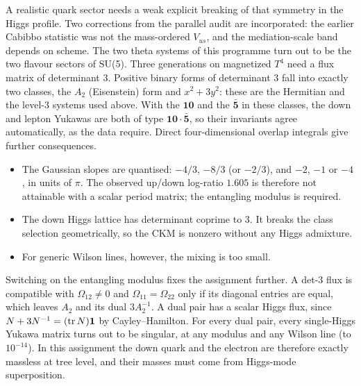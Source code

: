 A realistic quark sector needs a weak explicit breaking of that symmetry in the Higgs profile. Two corrections from
the parallel audit are incorporated: the earlier Cabibbo statistic was not the mass-ordered $V_{us}$, and the
mediation-scale band depends on scheme. 
The two theta systems of this programme turn out to be the two flavour sectors of SU(5). Three generations on
magnetized $T^4$ need a flux matrix of determinant 3. Positive binary forms of determinant 3 fall into exactly two
classes, the $A_2$ (Eisenstein) form and $x^2+3y^2$: these are the Hermitian and the level-3 systems used above. With the
$\mathbf{10}$ and the $\bar{\mathbf5}$ in these classes, the down and lepton Yukawas are both of type
$\mathbf{10}\cdot\bar{\mathbf5}$, so their invariants agree automatically, as the data require. Direct four-dimensional
overlap integrals give further consequences.
\begin{itemize}
\item The Gaussian slopes are quantised: $-4/3$, $-8/3$ (or $-2/3$), and $-2$, $-1$ or $-4$, in units of $\pi$. The
observed up/down log-ratio $1.605$ is therefore not attainable with a scalar period matrix; the entangling modulus is
required.
\item The down Higgs lattice has determinant coprime to 3. It breaks the class selection geometrically, so the CKM is
nonzero without any Higgs admixture.
\item For generic Wilson lines, however, the mixing is too small.
\end{itemize}
Switching on the entangling modulus fixes the assignment further. A det-3 flux is compatible with
$\Omega_{12}\ne0$ and $\Omega_{11}=\Omega_{22}$ only if its diagonal entries are equal, which leaves $A_2$ and its dual
$3A_2^{-1}$. A dual pair has a scalar Higgs flux, since $N+3N^{-1}=({\rm tr}\,N)\mathbf1$ by Cayley--Hamilton. For every
dual pair, every single-Higgs Yukawa matrix turns out to be singular, at any modulus and any Wilson line (to
$10^{-14}$). In this assignment the down quark and the electron are therefore exactly massless at tree level, and their
masses must come from Higgs-mode superposition. 

